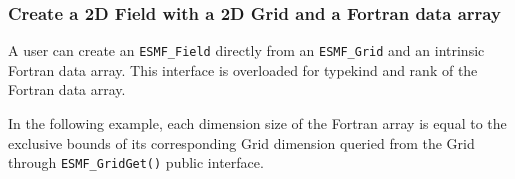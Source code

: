  
\setlength{\oldparskip}{\parskip}
\setlength{\parskip}{1.5ex}
\setlength{\oldparindent}{\parindent}
\setlength{\parindent}{0pt}
\setlength{\oldbaselineskip}{\baselineskip}
\setlength{\baselineskip}{11pt}
 
\def\bv{\begin{verbatim}}
\def\ev{\end{verbatim}}
\def\be{\begin{equation}}
\def\ee{\end{equation}}
\def\bea{\begin{eqnarray}}
\def\eea{\end{eqnarray}}
\def\bi{\begin{itemize}}
\def\ei{\end{itemize}}
\def\bn{\begin{enumerate}}
\def\en{\end{enumerate}}
\def\bd{\begin{description}}
\def\ed{\end{description}}
\def\({\left (}
\def\){\right )}
\def\[{\left [}
\def\]{\right ]}
\def\<{\left  \langle}
\def\>{\right \rangle}
\def\cI{{\cal I}}
\def\diag{\mathop{\rm diag}}
\def\tr{\mathop{\rm tr}}


 

  \subsubsection{Create a 2D Field with a 2D Grid and a Fortran data array}
  \label{sec:field:usage:create_2darray}
  
    A user can create an {\tt ESMF\_Field} directly from an {\tt ESMF\_Grid} and an intrinsic 
    Fortran data array. This interface is overloaded for typekind and rank
    of the Fortran data array.  
  
    In the following example, each dimension size of the Fortran array is equal to the 
    exclusive bounds of its corresponding 
    Grid dimension queried from the Grid through {\tt ESMF\_GridGet()} public interface.
  

